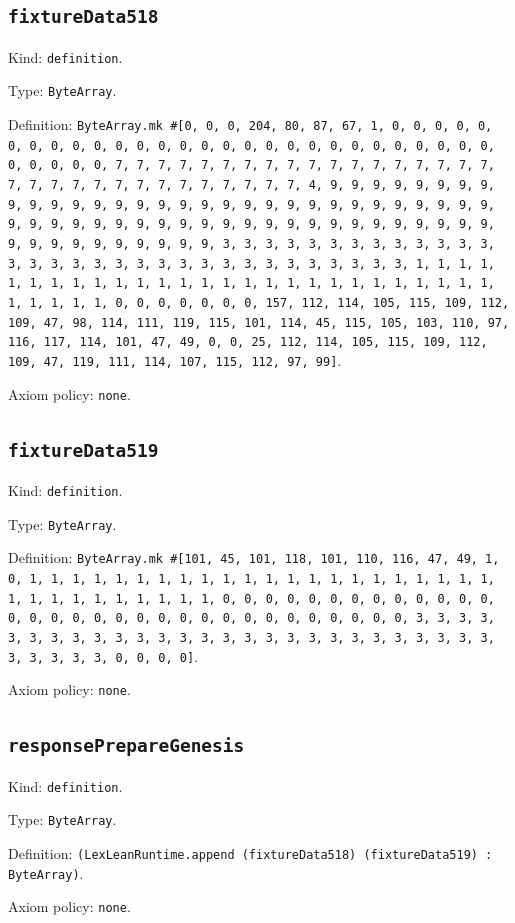 \documentclass[11pt]{article}
\begin{document}
\subsection*{\texttt{fixtureData518}}
\noindent Kind: \texttt{definition}.\par
\noindent Type: \texttt{ByteArray}.\par
\noindent Definition: \texttt{ByteArray.mk \#[0, 0, 0, 204, 80, 87, 67, 1, 0, 0, 0, 0, 0, 0, 0, 0, 0, 0, 0, 0, 0, 0, 0, 0, 0, 0, 0, 0, 0, 0, 0, 0, 0, 0, 0, 0, 0, 0, 0, 0, 0, 7, 7, 7, 7, 7, 7, 7, 7, 7, 7, 7, 7, 7, 7, 7, 7, 7, 7, 7, 7, 7, 7, 7, 7, 7, 7, 7, 7, 7, 7, 7, 7, 4, 9, 9, 9, 9, 9, 9, 9, 9, 9, 9, 9, 9, 9, 9, 9, 9, 9, 9, 9, 9, 9, 9, 9, 9, 9, 9, 9, 9, 9, 9, 9, 9, 9, 9, 9, 9, 9, 9, 9, 9, 9, 9, 9, 9, 9, 9, 9, 9, 9, 9, 9, 9, 9, 9, 9, 9, 9, 9, 9, 9, 9, 9, 9, 9, 3, 3, 3, 3, 3, 3, 3, 3, 3, 3, 3, 3, 3, 3, 3, 3, 3, 3, 3, 3, 3, 3, 3, 3, 3, 3, 3, 3, 3, 3, 3, 3, 1, 1, 1, 1, 1, 1, 1, 1, 1, 1, 1, 1, 1, 1, 1, 1, 1, 1, 1, 1, 1, 1, 1, 1, 1, 1, 1, 1, 1, 1, 1, 1, 0, 0, 0, 0, 0, 0, 0, 157, 112, 114, 105, 115, 109, 112, 109, 47, 98, 114, 111, 119, 115, 101, 114, 45, 115, 105, 103, 110, 97, 116, 117, 114, 101, 47, 49, 0, 0, 25, 112, 114, 105, 115, 109, 112, 109, 47, 119, 111, 114, 107, 115, 112, 97, 99]}.\par
\noindent Axiom policy: \texttt{none}.\par
\subsection*{\texttt{fixtureData519}}
\noindent Kind: \texttt{definition}.\par
\noindent Type: \texttt{ByteArray}.\par
\noindent Definition: \texttt{ByteArray.mk \#[101, 45, 101, 118, 101, 110, 116, 47, 49, 1, 0, 1, 1, 1, 1, 1, 1, 1, 1, 1, 1, 1, 1, 1, 1, 1, 1, 1, 1, 1, 1, 1, 1, 1, 1, 1, 1, 1, 1, 1, 1, 1, 1, 0, 0, 0, 0, 0, 0, 0, 0, 0, 0, 0, 0, 0, 0, 0, 0, 0, 0, 0, 0, 0, 0, 0, 0, 0, 0, 0, 0, 0, 0, 0, 0, 3, 3, 3, 3, 3, 3, 3, 3, 3, 3, 3, 3, 3, 3, 3, 3, 3, 3, 3, 3, 3, 3, 3, 3, 3, 3, 3, 3, 3, 3, 3, 3, 0, 0, 0, 0]}.\par
\noindent Axiom policy: \texttt{none}.\par
\subsection*{\texttt{responsePrepareGenesis}}
\noindent Kind: \texttt{definition}.\par
\noindent Type: \texttt{ByteArray}.\par
\noindent Definition: \texttt{(LexLeanRuntime.append (fixtureData518) (fixtureData519) : ByteArray)}.\par
\noindent Axiom policy: \texttt{none}.\par
\end{document}
